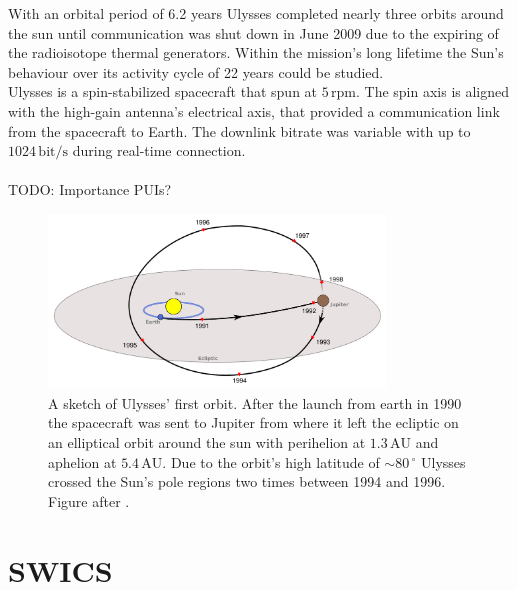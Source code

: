 With an orbital period of 6.2 years Ulysses completed nearly three orbits around the sun until communication was shut down in June 2009 due to the expiring of the radioisotope thermal generators.
Within the mission's long lifetime the Sun's behaviour over its activity cycle of 22 years could be studied.\\
Ulysses is a spin-stabilized spacecraft that spun at $5\,\mathrm{rpm}$. The spin axis is aligned with the high-gain antenna's electrical axis, that provided a communication link from the spacecraft to Earth. The downlink bitrate was variable with up to $1024\,\mathrm{bit/s}$ during real-time connection.
\\ \\ 
TODO: Importance PUIs?
\begin{figure}[h]
	\includegraphics[width=0.8\textwidth]{Figures/ulysses_trajectory.pdf}
	\centering
	\caption{A sketch of Ulysses' first orbit. After the launch from earth in 1990 the spacecraft was sent to Jupiter from where it left the ecliptic on an elliptical orbit around the sun with perihelion at $1.3\,\mathrm{AU}$ and aphelion at $5.4\,\mathrm{AU}$. Due to the orbit's high latitude of $\sim 80 \, ^\circ$ Ulysses crossed the Sun's pole regions two times between 1994 and 1996. Figure after \citet{esa_orbit}.}
	\label{fig:trajectory}
\end{figure}
%
%
%
%
%
\section{SWICS}
\label{sec:swics}


